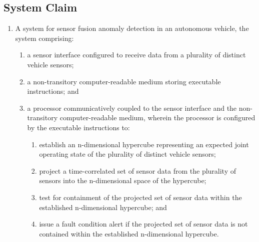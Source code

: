\documentclass{article}
\begin{document}
\subsection{System Claim}
\begin{enumerate}[label=1.]
    \item A system for sensor fusion anomaly detection in an autonomous vehicle, the system comprising:
    \begin{enumerate}[label=(\alph*)]
        \item a sensor interface configured to receive data from a plurality of distinct vehicle sensors;
        \item a non-transitory computer-readable medium storing executable instructions; and
        \item a processor communicatively coupled to the sensor interface and the non-transitory computer-readable medium, wherein the processor is configured by the executable instructions to:
        \begin{enumerate}[label=(\roman*)]
            \item establish an n-dimensional hypercube representing an expected joint operating state of the plurality of distinct vehicle sensors;
            \item project a time-correlated set of sensor data from the plurality of sensors into the n-dimensional space of the hypercube;
            \item test for containment of the projected set of sensor data within the established n-dimensional hypercube; and
            \item issue a fault condition alert if the projected set of sensor data is not contained within the established n-dimensional hypercube.
        \end{enumerate}
    \end{enumerate}
\end{enumerate}
\end{document}
